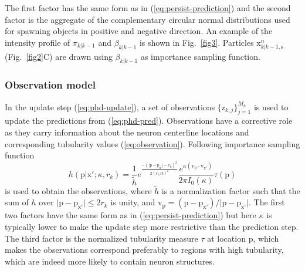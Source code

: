 The first factor has the same form as in (\ref{eq:persist-prediction}) and the second factor is the aggregate of the complementary circular normal distributions used for spawning objects in positive and negative direction. An example of the intensity profile of $\pi_{k|k-1}$ and $\beta_{k|k-1}$ is shown in Fig.~\ref{fig3}. Particles $\mathrm{x}_{k|k-1,\mathrm{s}}^{n}$ (Fig.~\ref{fig2}C) are drawn using $\beta_{k|k-1}$ as importance sampling function.

\subsubsection{Observation model}
\label{sssec:observation-model}
In the update step (\ref{eq:phd-update}), a set of observations $\{\mathrm{z}_{k,j}\}_{j=1}^{M_k}$ is used to update the predictions from (\ref{eq:phd-pred}). Observations have a corrective role as they carry information about the neuron centerline locations and corresponding tubularity values (\ref{eq:observation}). Following importance sampling function%
\begin{equation}
\label{eq:observation-importance-sampling}
h(\mathrm{p} | \mathrm{x'}; \kappa, r_k) = \frac{1}{\tilde{h}} e^{\frac{ -(\vert \mathrm{p} - \mathrm{p}_{\mathrm{x'}}  \vert - r_k)^2  }{2 (r_k/3)^2}} \frac{e^{\kappa (\mathrm{v}_{\mathrm{p}} \cdot \mathrm{v}_{\mathrm{x'}})}}{2 \pi I_0(\kappa)} \tau(\mathrm{p})
\end{equation}%
is used to obtain the observations, where $\tilde{h}$ is a normalization factor such that the sum of $h$ over $\vert \mathrm{p} - \mathrm{p}_{\mathrm{x'}} \vert \leq 2r_k$ is unity, and $\mathrm{v}_{\mathrm{p}}=(\mathrm{p}-\mathrm{p}_{\mathrm{x'}})/\vert \mathrm{p}-\mathrm{p}_{\mathrm{x'}}\vert$. The first two factors have the same form as in (\ref{eq:persist-prediction}) but here $\kappa$ is typically lower to make the update step more restrictive than the prediction step. The third factor is the normalized tubularity measure $\tau$ \cite{sato1998three} at location $\mathrm{p}$, which makes the observations correspond preferably to regions with high tubularity, which are indeed more likely to contain neuron structures.


